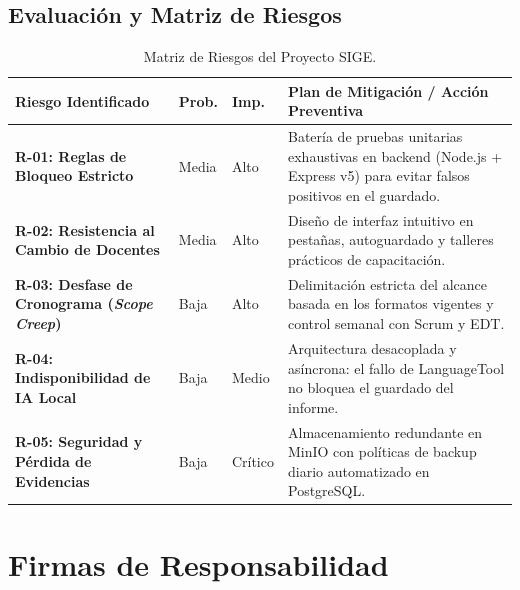 \documentclass[12pt,a4paper]{article}
\begin{document}
\subsection{Evaluación y Matriz de Riesgos}
\begin{table}[htbp]
\centering
\small
\begin{tabularx}{\textwidth}{|>{\hsize=0.75\hsize\bfseries}X|>{\hsize=0.3\hsize\centering\arraybackslash}X|>{\hsize=0.3\hsize\centering\arraybackslash}X|>{\hsize=1.65\hsize}X|}
    \hline
    \rowcolor{tableheader}
    Riesgo Identificado & Prob. & Imp. & Plan de Mitigación / Acción Preventiva \\
    \hline
    R-01: Reglas de Bloqueo Estricto & Media & Alto & Batería de pruebas unitarias exhaustivas en backend (Node.js + Express v5) para evitar falsos positivos en el guardado. \\
    \hline
    R-02: Resistencia al Cambio de Docentes & Media & Alto & Diseño de interfaz intuitivo en pestañas, autoguardado y talleres prácticos de capacitación. \\
    \hline
    R-03: Desfase de Cronograma (\textit{Scope Creep}) & Baja & Alto & Delimitación estricta del alcance basada en los formatos vigentes y control semanal con Scrum y EDT. \\
    \hline
    R-04: Indisponibilidad de IA Local & Baja & Medio & Arquitectura desacoplada y asíncrona: el fallo de LanguageTool no bloquea el guardado del informe. \\
    \hline
    R-05: Seguridad y Pérdida de Evidencias & Baja & Crítico & Almacenamiento redundante en MinIO con políticas de backup diario automatizado en PostgreSQL. \\
    \hline
\end{tabularx}
\caption{Matriz de Riesgos del Proyecto SIGE.}
\label{tab:s1_06_riesgos}
\end{table}

\vspace{0.3cm}

\section{Firmas de Responsabilidad}
\end{document}
